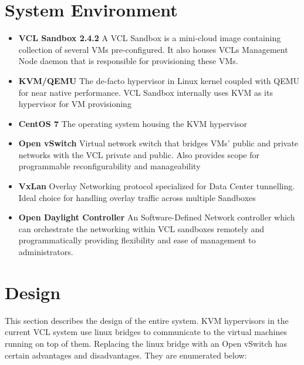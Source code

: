 \documentclass[12pt]{extarticle}
\begin{document}
\section{System Environment}
\begin{itemize}
    \item \textbf{VCL Sandbox 2.4.2}
    \newline
     A VCL Sandbox is a mini-cloud image containing collection of several VMs pre-configured. It also houses VCL\textquotesingle s Management Node daemon that is responsible for provisioning these VMs.
     
    \item \textbf{KVM/QEMU}
    \newline
    The de-facto hypervisor in Linux kernel coupled with QEMU for near native performance. VCL Sandbox internally uses KVM as its hypervisor for VM provisioning 
    
    \item \textbf{CentOS 7}
    \newline
    The operating system housing the KVM hypervisor 
    
    \item \textbf{Open vSwitch}
    \newline
    Virtual network switch that bridges VMs' public and private networks with the VCL private and public. Also provides scope for programmable reconfigurability and manageability
    
    \item \textbf{VxLan}
    \newline
    Overlay Networking protocol specialized for Data Center tunnelling. Ideal choice for handling overlay traffic across multiple Sandboxes
    
    \item \textbf{Open Daylight Controller}
    \newline
    An Software-Defined Network controller which can orchestrate the networking within VCL sandboxes remotely and programmatically providing flexibility and ease of management to administrators.
    
\end{itemize}


\section{Design}

This section describes the design of the entire system. 
KVM hypervisors in the current VCL system use linux bridges to communicate to the virtual machines running on top of them. Replacing the linux bridge with an Open vSwitch has certain advantages and disadvantages. They are enumerated below:
\\
\end{document}
